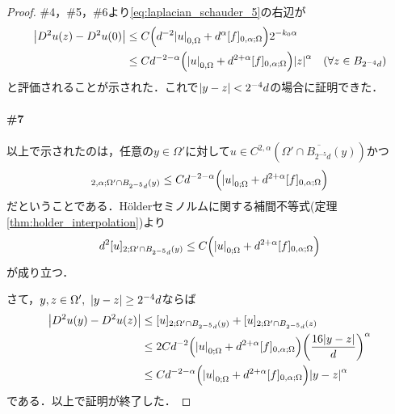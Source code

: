 \documentclass[a4paper]{ltjsarticle}
\newcommand{\Om}{\Omega}
\newcommand{\1}{\mathbbm{1}}
\numberwithin{equation}{section}
\theoremstyle{definition}
\begin{document}
\begin{proof}
    \#4，\#5，\#6より\eqref{eq:laplacian_schauder_5}の右辺が
    \begin{align}
        \abs{D^2u(z)-D^2u(0)}&\leq C\qty(d^{-2}\abs{u}_{0,\Om}+d^{\alpha}[f]_{0,\alpha;\Om})2^{-k_0\alpha}\\
        &\leq Cd^{-2-\alpha}\qty(\abs{u}_{0,\Om}+d^{2+\alpha}[f]_{0,\alpha;\Om})\abs{z}^\alpha\quad (\forall z\in B_{2^{-4}d}) 
    \end{align}
    と評価されることが示された．これで$\abs{y-z}<2^{-4}d$の場合に証明できた．

    \paragraph*{\#7}以上で示されたのは，任意の$y\in\Om'$に対して$u\in C^{2,\alpha}(\overline{\Om'\cap B_{2^{-5}d}(y)})$かつ
    \begin{equation}
        [u]_{2,\alpha;\Om'\cap B_{2^{-5}d}(y)}\leq Cd^{-2-\alpha}\qty(\abs{u}_{0;\Om}+d^{2+\alpha}[f]_{0,\alpha;\Om})
    \end{equation}
    だということである．Hölderセミノルムに関する補間不等式(定理\ref{thm:holder_interpolation})より
    \begin{equation}
        d^2[u]_{2;\Om'\cap B_{2^{-5}d}(y)}\leq C\qty(\abs{u}_{0;\Om}+d^{2+\alpha}[f]_{0,\alpha;\Om}) 
    \end{equation}
    が成り立つ．

    さて，$y,z\in \Om',\ \abs{y-z}\geq 2^{-4}d$ならば
    \begin{align}
        \abs{D^2u(y)-D^2u(z)}&\leq [u]_{2;\Om'\cap B_{2^{-5}d}(y)}+[u]_{2;\Om'\cap B_{2^{-5}d}(z)}\\
        &\leq 2Cd^{-2}\qty(\abs{u}_{0;\Om}+d^{2+\alpha}[f]_{0,\alpha;\Om})\qty(\frac{16\abs{y-z}}{d})^{\alpha}\\
        &\leq Cd^{-2-\alpha}\qty(\abs{u}_{0;\Om}+d^{2+\alpha}[f]_{0,\alpha;\Om})\abs{y-z}^\alpha 
    \end{align}
    である．以上で証明が終了した．
\end{proof}
\end{document}
